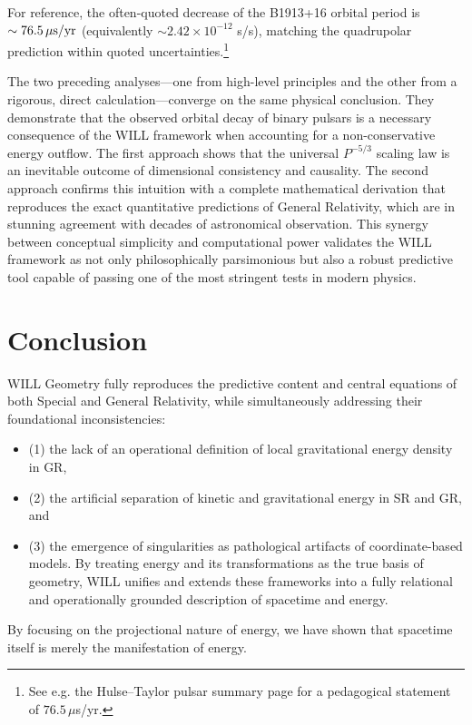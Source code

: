 \documentclass[12pt, a4paper]{article}
\begin{document}
For reference, the often-quoted decrease of the B1913+16 orbital period is
$\sim 76.5\,\mu{\rm s/yr}$ (equivalently $\sim 2.42\times10^{-12}$ s/s), matching the
quadrupolar prediction within quoted uncertainties.\footnote{See e.g. the Hulse--Taylor
pulsar summary page for a pedagogical statement of $76.5\,\mu$s/yr.}

The two preceding analyses—one from high-level principles and the other from a rigorous, direct calculation—converge on the same physical conclusion. They demonstrate that the observed orbital decay of binary pulsars is a necessary consequence of the WILL framework when accounting for a non-conservative energy outflow. The first approach shows that the universal $P^{-5/3}$ scaling law is an inevitable outcome of dimensional consistency and causality. The second approach confirms this intuition with a complete mathematical derivation that reproduces the exact quantitative predictions of General Relativity, which are in stunning agreement with decades of astronomical observation. This synergy between conceptual simplicity and computational power validates the WILL framework as not only philosophically parsimonious but also a robust predictive tool capable of passing one of the most stringent tests in modern physics.

\section{Conclusion}

 WILL Geometry fully reproduces the predictive content and central equations of both Special and General Relativity, while simultaneously addressing their foundational inconsistencies: 
 \begin{itemize}
     \item (1) the lack of an operational definition of local gravitational energy density in GR, 
     \item (2) the artificial separation of kinetic and gravitational energy in SR and GR, and 
     \item (3) the emergence of singularities as pathological artifacts of coordinate-based models. By treating energy and its transformations as the true basis of geometry, WILL unifies and extends these frameworks into a fully relational and operationally grounded description of spacetime and energy.
 \end{itemize}

By focusing on the projectional nature of energy, we have shown that spacetime itself is merely the manifestation of energy.
\end{document}
